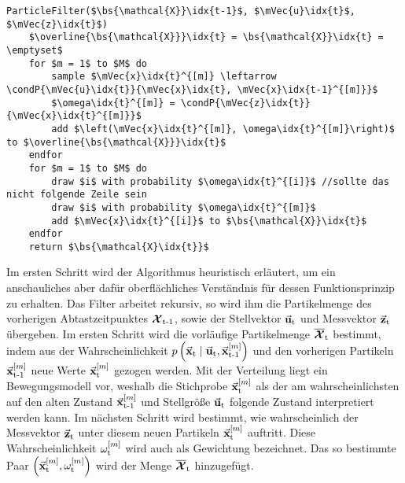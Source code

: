 \begin{lstlisting}[mathescape=true, caption={Partikel-Filter}, captionpos=bot]
ParticleFilter($\bs{\mathcal{X}}\idx{t-1}$, $\mVec{u}\idx{t}$, $\mVec{z}\idx{t}$)
	$\overline{\bs{\mathcal{X}}}\idx{t} = \bs{\mathcal{X}}\idx{t} = \emptyset$
	for $m = 1$ to $M$ do
		sample $\mVec{x}\idx{t}^{[m]} \leftarrow \condP{\mVec{u}\idx{t}}{\mVec{x}\idx{t}, \mVec{x}\idx{t-1}^{[m]}}$
		$\omega\idx{t}^{[m]} = \condP{\mVec{z}\idx{t}}{\mVec{x}\idx{t}^{[m]}}$
		add $\left(\mVec{x}\idx{t}^{[m]}, \omega\idx{t}^{[m]}\right)$ to $\overline{\bs{\mathcal{X}}}\idx{t}$
	endfor
	for $m = 1$ to $M$ do
		draw $i$ with probability $\omega\idx{t}^{[i]}$ //sollte das nicht folgende Zeile sein
		draw $i$ with probability $\omega\idx{t}^{[m]}$
		add $\mVec{x}\idx{t}^{[i]}$ to $\bs{\mathcal{X}}\idx{t}$
	endfor
	return $\bs{\mathcal{X}\idx{t}}$
\end{lstlisting}
Im ersten Schritt wird der Algorithmus heuristisch erläutert, um ein anschauliches aber dafür oberflächliches Verständnis für dessen Funktionsprinzip zu erhalten. Das Filter arbeitet rekursiv, so wird ihm die Partikelmenge des vorherigen Abtastzeitpunktes $\boldsymbol{\mathcal{X}}_{\text{t-1}}$, sowie der Stellvektor $\vec{\mathbf{u}}_{\text{t}}$ und Messvektor $\vec{\mathbf{z}}_{\text{t}}$ übergeben. Im ersten Schritt wird die vorläufige Partikelmenge $\overline{\boldsymbol{\mathcal{X}}}_{\text{t}}$ bestimmt, indem aus der Wahrscheinlichkeit $p\left({\vec{\mathbf{x}}_{\text{t}}} \hspace{1mm} \vert \hspace{1mm} {\vec{\mathbf{u}}_{\text{t}}, \vec{\mathbf{x}}_{\text{t-1}}^{[m]}}\right)$ und den vorherigen Partikeln $\vec{\mathbf{x}}_{\text{t-1}}^{[m]}$ neue Werte $\vec{\mathbf{x}}_{\text{t}}^{[m]}$ gezogen werden. Mit der Verteilung liegt ein Bewegungsmodell vor, weshalb die Stichprobe $\vec{\mathbf{x}}_{\text{t}}^{[m]}$ als der am wahrscheinlichsten auf den alten Zustand $\vec{\mathbf{x}}_{\text{t-1}}^{[m]}$ und Stellgröße $\vec{\mathbf{u}}_{\text{t}}$ folgende Zustand interpretiert werden kann. Im nächsten Schritt wird bestimmt, wie wahrscheinlich der Messvektor $\vec{\mathbf{z}}_{\text{t}}$ unter diesem neuen Partikeln $\vec{\mathbf{x}}_{\text{t}}^{[m]}$ auftritt. Diese Wahrscheinlichkeit $\omega_{\text{t}}^{[m]}$ wird auch als Gewichtung bezeichnet. Das so bestimmte Paar $\left(\vec{\mathbf{x}}_{\text{t}}^{[m]}, \omega_{\text{t}}^{[m]}\right)$ wird der Menge $\overline{\boldsymbol{\mathcal{X}}}_{\text{t}}$ hinzugefügt. 

